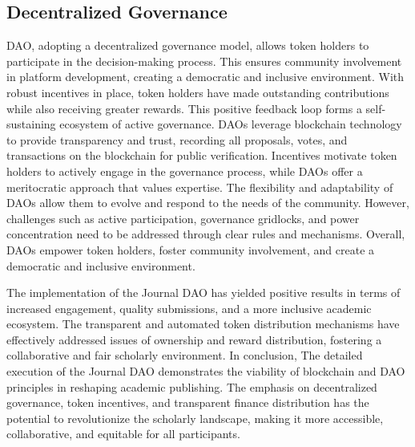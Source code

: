 \documentclass[lettersize,journal]{IEEEtran}
\begin{document}
\subsection{Decentralized Governance}

DAO, adopting a decentralized governance model, allows token holders to participate in the decision-making process. This ensures community involvement in platform development, creating a democratic and inclusive environment. With robust incentives in place, token holders have made outstanding contributions while also receiving greater rewards. This positive feedback loop forms a self-sustaining ecosystem of active governance. DAOs leverage blockchain technology to provide transparency and trust, recording all proposals, votes, and transactions on the blockchain for public verification. Incentives motivate token holders to actively engage in the governance process, while DAOs offer a meritocratic approach that values expertise. The flexibility and adaptability of DAOs allow them to evolve and respond to the needs of the community. However, challenges such as active participation, governance gridlocks, and power concentration need to be addressed through clear rules and mechanisms. Overall, DAOs empower token holders, foster community involvement, and create a democratic and inclusive environment.

The implementation of the Journal DAO has yielded positive results in terms of increased engagement, quality submissions, and a more inclusive academic ecosystem. The transparent and automated token distribution mechanisms have effectively addressed issues of ownership and reward distribution, fostering a collaborative and fair scholarly environment.
In conclusion, The detailed execution of the Journal DAO demonstrates the viability of blockchain and DAO principles in reshaping academic publishing. The emphasis on decentralized governance, token incentives, and transparent finance distribution has the potential to revolutionize the scholarly landscape, making it more accessible, collaborative, and equitable for all participants.
\end{document}
